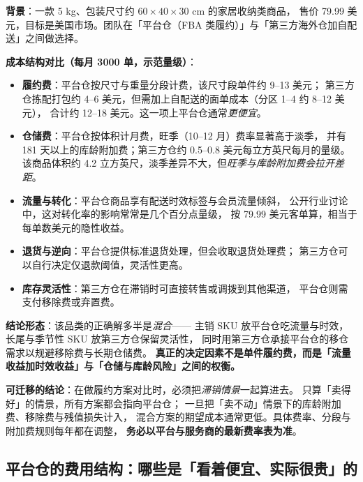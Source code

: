 \begin{casebox}
\textbf{背景}：一款 5 kg、包装尺寸约 $60\times40\times30$ cm 的家居收纳类商品，
售价 79.99 美元，目标是美国市场。团队在「平台仓（FBA 类履约）」与「第三方海外仓加自配送」之间做选择。

\textbf{成本结构对比（每月 3000 单，示范量级）}：
\begin{itemize}
  \item \textbf{履约费}：平台仓按尺寸与重量分段计费，该尺寸段单件约 9--13 美元；
        第三方仓拣配打包约 4--6 美元，但需加上自配送的面单成本（分区 1--4 约 8--12 美元），
        合计约 12--18 美元。这一项上平台仓通常\emph{更便宜}。
  \item \textbf{仓储费}：平台仓按体积计月费，旺季（10--12 月）费率显著高于淡季，
        并有 181 天以上的库龄附加费；第三方仓约 0.5--0.8 美元每立方英尺每月的量级。
        该商品体积约 4.2 立方英尺，淡季差异不大，但\emph{旺季与库龄附加费会拉开差距}。
  \item \textbf{流量与转化}：平台仓商品享有配送时效标签与会员流量倾斜，
        公开行业讨论中，这对转化率的影响常常是几个百分点量级，
        按 79.99 美元客单算，相当于每单数美元的隐性收益。
  \item \textbf{退货与逆向}：平台仓提供标准退货处理，但会收取退货处理费；
        第三方仓可以自行决定仅退款阈值，灵活性更高。
  \item \textbf{库存灵活性}：第三方仓在滞销时可直接转售或调拨到其他渠道，
        平台仓则需支付移除费或弃置费。
\end{itemize}

\textbf{结论形态}：该品类的正确解多半是\emph{混合}——
主销 SKU 放平台仓吃流量与时效，长尾与季节性 SKU 放第三方仓保留灵活性，
同时用第三方仓承接平台仓的移仓需求以规避移除费与长期仓储费。
\textbf{真正的决定因素不是单件履约费，而是「流量收益加时效收益」与「仓储与库龄风险」之间的权衡。}

\textbf{可迁移的结论}：在做履约方案对比时，必须把\emph{滞销情景}一起算进去。
只算「卖得好」的情景，所有方案都会指向平台仓；
一旦把「卖不动」情景下的库龄附加费、移除费与残值损失计入，
混合方案的期望成本通常更低。具体费率、分段与附加费规则每年都在调整，
\textbf{务必以平台与服务商的最新费率表为准}。
\end{casebox}

\subsection{平台仓的费用结构：哪些是「看着便宜、实际很贵」的}

